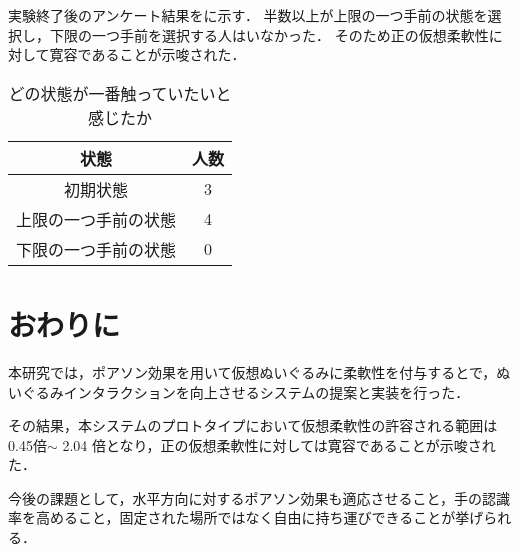 \documentclass[uplatex]{jsarticle}   %
\begin{document}
    実験終了後のアンケート結果をに示す．
    半数以上が上限の一つ手前の状態を選択し，下限の一つ手前を選択する人はいなかった．
    そのため正の仮想柔軟性に対して寛容であることが示唆された．
    


    \begin{table}[t]
        \caption{\label{tab:result3}どの状態が一番触っていたいと感じたか}
        \centering
        \begin{tabular}{c|c}
            \hline
            \hline
            状態 &人数 \\
            \hline
            初期状態 &3 \\
            上限の一つ手前の状態 &4 \\
            下限の一つ手前の状態 &0 \\
            \hline
        \end{tabular}
    \end{table}

\section{おわりに}
本研究では，ポアソン効果を用いて仮想ぬいぐるみに柔軟性を付与するとで，ぬいぐるみインタラクションを向上させるシステムの提案と実装を行った．

その結果，本システムのプロトタイプにおいて仮想柔軟性の許容される範囲は 0.45倍$\sim$ 2.04 倍となり，正の仮想柔軟性に対しては寛容であることが示唆された．

今後の課題として，水平方向に対するポアソン効果も適応させること，手の認識率を高めること，固定された場所ではなく自由に持ち運びできることが挙げられる．




\end{document}
